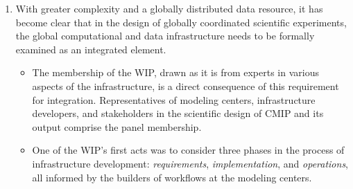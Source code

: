 \documentclass[gmd,manuscript]{copernicus}
\begin{document}
\begin{enumerate}
\item With greater complexity and a globally distributed data
  resource, it has become clear that in the design of globally
  coordinated scientific experiments, the global computational and
  data infrastructure needs to be formally examined as an integrated
  element.
  \begin{itemize}
  \item The 
    membership of the WIP, drawn as it is from experts in various aspects of the
    infrastructure, is a direct consequence of this requirement for integration.  Representatives of modeling centers,
    infrastructure developers, and stakeholders in the scientific
    design of CMIP and its output comprise the panel membership.
  \item One of the WIP's first acts was to consider three phases in
    the process of infrastructure development: \emph{requirements},
    \emph{implementation}, and \emph{operations}, all informed by the
    builders of workflows at the modeling centers.
    

\end{itemize}
\end{enumerate}
\end{document}
